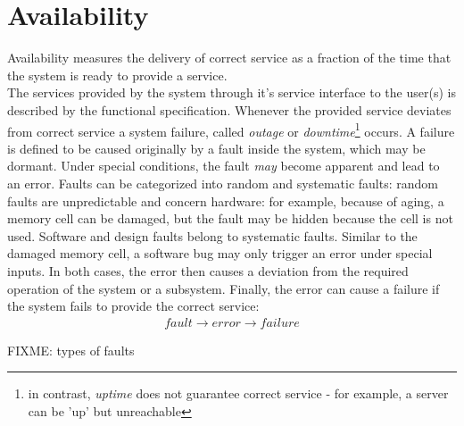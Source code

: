 \section{Availability}

Availability measures the delivery of correct service as a fraction of the time that the system is ready to provide a service. 
\\
The services provided by the system through it's service interface to the user(s) 
is described by the functional specification. Whenever the provided service
deviates from correct service a system failure, called \textit{outage} or \textit{downtime}\footnote{in contrast, \textit{uptime} does not guarantee correct
service - for example, a server can be 'up' but unreachable} occurs. A failure is defined to be caused originally by a fault inside the system, which may be 
dormant. Under special conditions, the fault \textit{may} become apparent and lead to an error. Faults can be categorized into random and systematic faults:
random faults are unpredictable and concern hardware: for example, because of aging, a memory cell can be damaged, but the fault may be hidden because the cell
is not used. Software and design faults belong to systematic faults. Similar to the damaged memory cell, a software bug may only 
trigger an error under special inputs. In both cases, the error then causes a deviation from the required operation of the system or a subsystem. Finally, the 
error can cause a failure if the system fails to provide the correct service:
\begin{align*}
 fault \rightarrow error \rightarrow failure
\end{align*}

FIXME: types of faults

